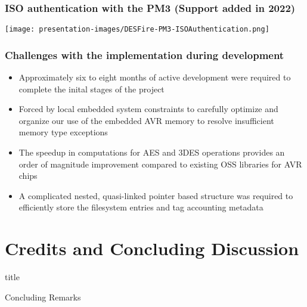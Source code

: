 \documentclass[usenames,svgnames,dvipsnames,11pt]{beamer}
\newcommand{\TitleBoxed}[1]{
     \begin{beamercolorbox}[sep=8pt,center,shadow=true,rounded=true]{title}
          \usebeamerfont{title}#1\par%
     \end{beamercolorbox}
}
\begin{document}
\begin{frame}
\frametitle{ISO authentication with the PM3 (Support added in 2022)}

\begin{center}
\texttt{[image: presentation-images/DESFire-PM3-ISOAuthentication.png]}
\end{center}

\end{frame}

\begin{frame}
\frametitle{Challenges with the implementation during development}

\begin{itemize}
\item Approximately six to eight months of active development were required to complete the inital stages of the project 
\item Forced by local embedded system 
      constraints to carefully optimize and organize our use of 
      the embedded AVR memory to resolve 
      insufficient memory type exceptions 
\item The speedup in computations for AES and 3DES operations 
      provides an order of magnitude improvement 
      compared to existing OSS libraries for AVR chips 
\item A complicated nested, quasi-linked pointer based structure was required to efficiently store the 
      filesystem entries and tag accounting metadata 
\end{itemize}

\end{frame}

\section{Credits and Concluding Discussion}

\begin{frame}
\TitleBoxed{
     \Huge{\centerline{Concluding Remarks}}
}
\end{frame}
\end{document}
